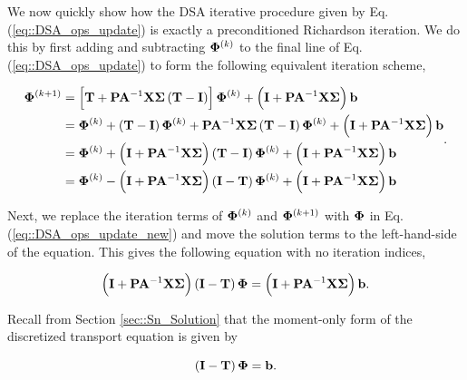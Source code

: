 We now quickly show how the DSA iterative procedure given by Eq. (\ref{eq::DSA_ops_update}) is exactly a preconditioned Richardson iteration. We do this by first adding and subtracting ${\bf \Phi}^{(k)}$ to the final line of Eq. (\ref{eq::DSA_ops_update}) to form the following equivalent iteration scheme,

\begin{equation}
\label{eq::DSA_ops_update_new}
\begin{aligned}
{\bf \Phi}^{(k+1)} &= \left[ {\bf T}  + {\bf P} {\bf A}^{-1} {\bf X} {\bf \Sigma} \left(  {\bf T}    - {\bf I} \right) \right] {\bf \Phi}^{(k)}  + \left( {\bf I}+ {\bf P} {\bf A}^{-1}  {\bf X} {\bf \Sigma}   \right) {\bf b} \\ 
&= {\bf \Phi}^{(k)}  + \left( {\bf T}-  {\bf I} \right){\bf \Phi}^{(k)}   + {\bf P} {\bf A}^{-1} {\bf X} {\bf \Sigma} \left(  {\bf T}    - {\bf I} \right) {\bf \Phi}^{(k)}  + \left( {\bf I} + {\bf P} {\bf A}^{-1}  {\bf X} {\bf \Sigma} \right) {\bf b} \\
&= {\bf \Phi}^{(k)} + \left( {\bf I} + {\bf P} {\bf A}^{-1} {\bf X} {\bf \Sigma} \right) \left(  {\bf T}    - {\bf I} \right) {\bf \Phi}^{(k)}  + \left( {\bf I}+ {\bf P} {\bf A}^{-1}  {\bf X} {\bf \Sigma}   \right) {\bf b} \\
&= {\bf \Phi}^{(k)} - \left( {\bf I} + {\bf P} {\bf A}^{-1} {\bf X} {\bf \Sigma} \right) \left(  {\bf I}    - {\bf T} \right) {\bf \Phi}^{(k)}  + \left({\bf I}+  {\bf P} {\bf A}^{-1}  {\bf X} {\bf \Sigma}   \right) {\bf b}
\end{aligned} .
\end{equation}

\noindent Next, we replace the iteration terms of ${\bf \Phi}^{(k)}$ and ${\bf \Phi}^{(k+1)}$ with ${\bf \Phi}$  in Eq. (\ref{eq::DSA_ops_update_new}) and move the solution terms to the left-hand-side of the equation. This gives the following equation with no iteration indices,

\begin{equation}
\label{eq::DSA_ops_prec_rich}
\left( {\bf I} + {\bf P} {\bf A}^{-1} {\bf X} {\bf \Sigma} \right) \left(  {\bf I}    - {\bf T} \right) {\bf \Phi} =  \left({\bf I}+  {\bf P} {\bf A}^{-1}  {\bf X} {\bf \Sigma}   \right) {\bf b} .
\end{equation}

\noindent Recall from Section \ref{sec::Sn_Solution} that the moment-only form of the discretized transport equation is given by 

\begin{equation}
\label{eq::DSA_ops_rich}
 \left(  {\bf I}    - {\bf T} \right) {\bf \Phi} =   {\bf b} .
\end{equation}

